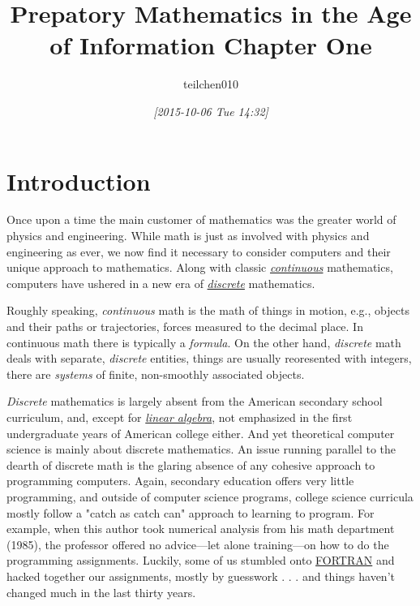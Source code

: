 \documentclass[koma]{article}
\author{teilchen010}
\date{\textit{[2015-10-06 Tue 14:32]}}
\title{Prepatory Mathematics in the Age of Information Chapter One}
\begin{document}
\maketitle
\tableofcontents

\begin{abstract}

\end{abstract}

\section{Introduction}
\label{sec:orgheadline1}

Once upon a time the main customer of mathematics was the greater world of physics and engineering. While math is just as involved with physics and engineering as ever, we now find it necessary to consider computers and their unique approach to mathematics. Along with classic \emph{\href{https://en.wikipedia.org/wiki/Mathematical_analysis}{continuous}} mathematics, computers have ushered in a new era of \emph{\href{https://en.wikipedia.org/wiki/Discrete_mathematics}{discrete}} mathematics.

Roughly speaking, \emph{continuous} math is the math of things in motion, e.g., objects and their paths or trajectories, forces measured to the decimal place. In continuous math there is typically a \emph{formula}. On the other hand, \emph{discrete} math deals with separate, \emph{discrete} entities, things are usually reoresented with integers, there are \emph{systems} of finite, non-smoothly associated objects.

\emph{Discrete} mathematics is largely absent from the American secondary school curriculum, and, except for \emph{\href{https://en.wikipedia.org/wiki/Linear_algebra}{linear algebra}}, not emphasized in the first undergraduate years of American college either. And yet theoretical computer science is mainly about discrete mathematics. An issue running parallel to the dearth of discrete math is the glaring absence of any cohesive approach to programming computers. Again, secondary education offers very little programming, and outside of computer science programs, college science curricula mostly follow a "catch as catch can" approach to learning to program. For example, when this author took numerical analysis from his math department (1985), the professor offered no advice---let alone training---on how to do the programming assignments. Luckily, some of us stumbled onto \href{https://en.wikipedia.org/wiki/Fortran}{FORTRAN} and hacked together our assignments, mostly by guesswork . . . and things haven't changed much in the last thirty years.
\end{document}
